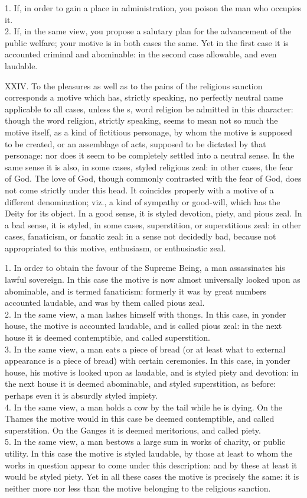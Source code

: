 \documentclass[12pt]{report}
\begin{document}
1. If, in order to gain a place in administration, you poison the man
who occupies it.\\
2. If, in the same view, you propose a salutary plan for the advancement
of the public welfare; your motive is in both cases the same. Yet in the
first case it is accounted criminal and abominable: in the second case
allowable, and even laudable.

XXIV. To the pleasures as well as to the pains of the religious sanction
corresponds a motive which has, strictly speaking, no perfectly neutral
name applicable to all cases, unless the s, word religion be admitted in
this character: though the word religion, strictly speaking, seems to
mean not so much the motive itself, as a kind of fictitious personage,
by whom the motive is supposed to be created, or an assemblage of acts,
supposed to be dictated by that personage: nor does it seem to be
completely settled into a neutral sense. In the same sense it is also,
in some cases, styled religious zeal: in other cases, the fear of God.
The love of God, though commonly contrasted with the fear of God, does
not come strictly under this head. It coincides properly with a motive
of a different denomination; viz., a kind of sympathy or good-will,
which has the Deity for its object. In a good sense, it is styled
devotion, piety, and pious zeal. In a bad sense, it is styled, in some
cases, superstition, or superstitious zeal: in other cases, fanaticism,
or fanatic zeal: in a sense not decidedly bad, because not appropriated
to this motive, enthusiasm, or enthusiastic zeal.

1. In order to obtain the favour of the Supreme Being, a man
assassinates his lawful sovereign. In this case the motive is now almost
universally looked upon as abominable, and is termed fanaticism:
formerly it was by great numbers accounted laudable, and was by them
called pious zeal.\\
2. In the same view, a man lashes himself with thongs. In this case, in
yonder house, the motive is accounted laudable, and is called pious
zeal: in the next house it is deemed contemptible, and called
superstition.\\
3. In the same view, a man eats a piece of bread (or at least what to
external appearance is a piece of bread) with certain ceremonies. In
this case, in yonder house, his motive is looked upon as laudable, and
is styled piety and devotion: in the next house it is deemed abominable,
and styled superstition, as before: perhaps even it is absurdly styled
impiety.\\
4. In the same view, a man holds a cow by the tail while he is dying. On
the Thames the motive would in this case be deemed contemptible, and
called superstition. On the Ganges it is deemed meritorious, and called
piety.\\
5. In the same view, a man bestows a large sum in works of charity, or
public utility. In this case the motive is styled laudable, by those at
least to whom the works in question appear to come under this
description: and by these at least it would be styled piety. Yet in all
these cases the motive is precisely the same: it is neither more nor
less than the motive belonging to the religious sanction.
\end{document}
